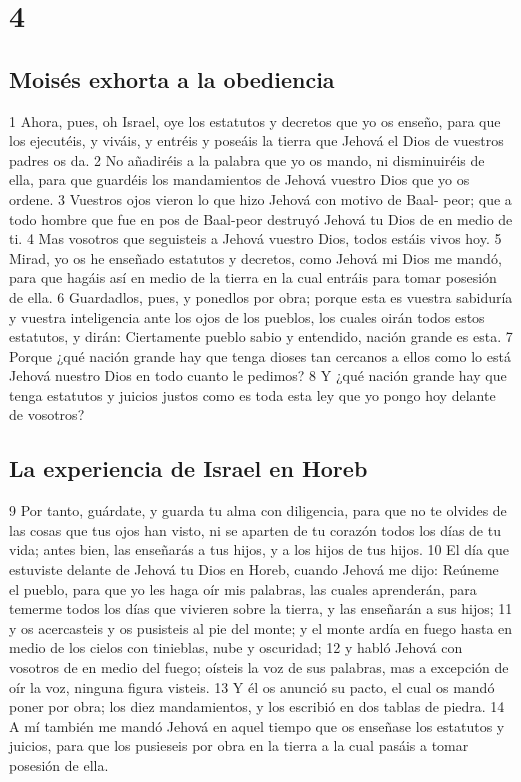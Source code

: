 \chapter{4}


\section{Moisés exhorta a la obediencia}


1 Ahora, pues, oh Israel, oye los estatutos y decretos que yo os enseño, para que los ejecutéis, y viváis, y entréis y poseáis la tierra que Jehová el Dios de vuestros padres os da.
2 No añadiréis a la palabra que yo os mando, ni disminuiréis de ella, para que guardéis los mandamientos de Jehová vuestro Dios que yo os ordene.
3 Vuestros ojos vieron lo que hizo Jehová con motivo de Baal- peor; que a todo hombre que fue en pos de Baal-peor destruyó Jehová tu Dios de en medio de ti.
4 Mas vosotros que seguisteis a Jehová vuestro Dios, todos estáis vivos hoy.
5 Mirad, yo os he enseñado estatutos y decretos, como Jehová mi Dios me mandó, para que hagáis así en medio de la tierra en la cual entráis para tomar posesión de ella.
6 Guardadlos, pues, y ponedlos por obra; porque esta es vuestra sabiduría y vuestra inteligencia ante los ojos de los pueblos, los cuales oirán todos estos estatutos, y dirán: Ciertamente pueblo sabio y entendido, nación grande es esta.
7 Porque ¿qué nación grande hay que tenga dioses tan cercanos a ellos como lo está Jehová nuestro Dios en todo cuanto le pedimos?
8 Y ¿qué nación grande hay que tenga estatutos y juicios justos como es toda esta ley que yo pongo hoy delante de vosotros?

\section{La experiencia de Israel en Horeb}

9 Por tanto, guárdate, y guarda tu alma con diligencia, para que no te olvides de las cosas que tus ojos han visto, ni se aparten de tu corazón todos los días de tu vida; antes bien, las enseñarás a tus hijos, y a los hijos de tus hijos.
10 El día que estuviste delante de Jehová tu Dios en Horeb, cuando Jehová me dijo: Reúneme el pueblo, para que yo les haga oír mis palabras, las cuales aprenderán, para temerme todos los días que vivieren sobre la tierra, y las enseñarán a sus hijos;
11 y os acercasteis y os pusisteis al pie del monte; y el monte ardía en fuego hasta en medio de los cielos con tinieblas, nube y oscuridad;
12 y habló Jehová con vosotros de en medio del fuego; oísteis la voz de sus palabras, mas a excepción de oír la voz, ninguna figura visteis.
13 Y él os anunció su pacto, el cual os mandó poner por obra; los diez mandamientos, y los escribió en dos tablas de piedra. 
14 A mí también me mandó Jehová en aquel tiempo que os enseñase los estatutos y juicios, para que los pusieseis por obra en la tierra a la cual pasáis a tomar posesión de ella.

